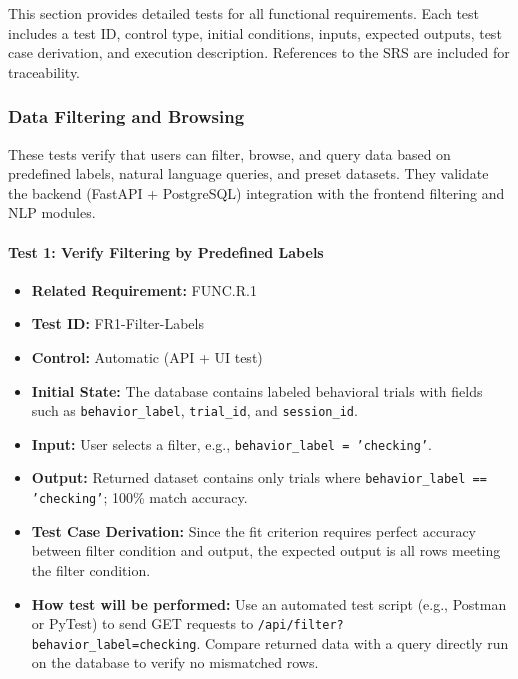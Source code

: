 \documentclass[12pt, titlepage]{article}
\begin{document}
This section provides detailed tests for all functional requirements. Each test
includes a test ID, control type, initial conditions, inputs, expected outputs,
test case derivation, and execution description. References to the SRS are
included for traceability. 

\subsubsection{Data Filtering and Browsing}

These tests verify that users can filter, browse, and query data based on
predefined labels, natural language queries, and preset datasets. They validate
the backend (FastAPI + PostgreSQL) integration with the frontend filtering and
NLP modules.

\paragraph{Test 1: Verify Filtering by Predefined Labels}
\begin{itemize}
    \item \textbf{Related Requirement:} FUNC.R.1
    \item \textbf{Test ID:} FR1-Filter-Labels
    \item \textbf{Control:} Automatic (API + UI test)
    \item \textbf{Initial State:} The database contains labeled behavioral trials with fields such as \texttt{behavior\_label}, \texttt{trial\_id}, and \texttt{session\_id}.
    \item \textbf{Input:} User selects a filter, e.g., \texttt{behavior\_label = 'checking'}.
    \item \textbf{Output:} Returned dataset contains only trials where \texttt{behavior\_label == 'checking'}; 100\% match accuracy.
    \item \textbf{Test Case Derivation:} Since the fit criterion requires perfect accuracy between filter condition and output, the expected output is all rows meeting the filter condition.
    \item \textbf{How test will be performed:} Use an automated test script (e.g., Postman or PyTest) to send GET requests to \texttt{/api/filter?behavior\_label=checking}. Compare returned data with a query directly run on the database to verify no mismatched rows.
\end{itemize}
\end{document}
